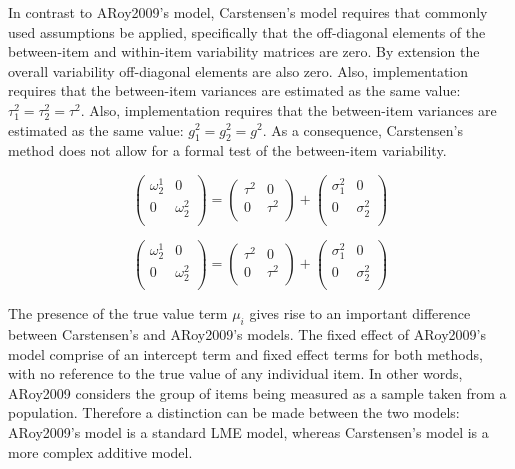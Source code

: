 \documentclass[12pt, a4paper]{report}
\theoremstyle{plain}
\theoremstyle{definition}
\theoremstyle{remark}
\begin{document}
	In contrast to ARoy2009's model, Carstensen's model requires that commonly used assumptions be applied, specifically that the off-diagonal elements of the between-item and within-item variability matrices are zero. By
	extension the overall variability off-diagonal elements are also zero. Also, implementation requires that the between-item variances are estimated as the same value: $\tau^2_1 = \tau^2_2 = \tau^2$.
	Also, implementation requires that the between-item variances are estimated as the same value: $g^2_1 = g^2_2 = g^2$.
	As a consequence, Carstensen's method does not allow for a formal test of the between-item variability.
	
	\[\left(\begin{array}{cc}
	\omega^1_2  & 0 \\
	0 & \omega^2_2 \\
	\end{array}  \right)
	=  \left(
	\begin{array}{cc}
	\tau^2  & 0 \\
	0 & \tau^2 \\
	\end{array} \right)+
	\left(
	\begin{array}{cc}
	\sigma^2_1  & 0 \\
	0 & \sigma^2_2 \\
	\end{array}\right)
	\]
	
	
	\[\left(\begin{array}{cc}
	\omega^1_2  & 0 \\
	0 & \omega^2_2 \\
	\end{array}  \right)
	=  \left(
	\begin{array}{cc}
	\tau^2  & 0 \\
	0 & \tau^2 \\
	\end{array} \right)+
	\left(
	\begin{array}{cc}
	\sigma^2_1  & 0 \\
	0 & \sigma^2_2 \\
	\end{array}\right)
	\]
	
	The presence of the true value term $\mu_i$ gives rise to an important difference between Carstensen's and ARoy2009's models. The fixed effect of ARoy2009's model comprise of an intercept term and fixed effect terms for both methods, with no reference to the true value of any individual item. In other words, ARoy2009 considers the group of items being measured as a sample taken from a population. Therefore a distinction can be made between the two models: ARoy2009's model is a standard LME model, whereas Carstensen's model is a more complex additive model.
	
\end{document}
